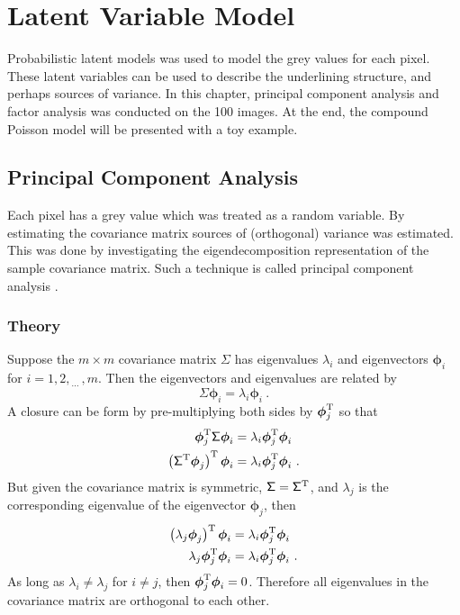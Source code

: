 \documentclass[12pt]{report}
\newcommand{\T}{^\textup{T}}
\newcommand{\dotdotdot}{_{\phantom{.}\cdots}}
\newcommand{\vectGreek}[1]{\boldsymbol{#1}}
\newcommand{\matr}[1]{\mathsf{#1}}
\begin{document}
\chapter{Latent Variable Model}
Probabilistic latent models was used to model the grey values for each pixel. These latent variables can be used to describe the underlining structure, and perhaps sources of variance. In this chapter, principal component analysis and factor analysis was conducted on the 100 images. At the end, the compound Poisson model will be presented with a toy example.

\section{Principal Component Analysis}
Each pixel has a grey value which was treated as a random variable. By estimating the covariance matrix sources of (orthogonal) variance was estimated. This was done by investigating the eigendecomposition representation of the sample covariance matrix. Such a technique is called principal component analysis \cite[pp.~329-330]{barber2012bayesian}.

\subsection{Theory}
Suppose the $m\times m$ covariance matrix $\matr{\Sigma}$ has eigenvalues $\lambda_i$ and eigenvectors $\vectGreek{\phi}_i$ for $i=1,2,\dotdotdot,m$. Then the eigenvectors and eigenvalues are related by
\begin{equation}
\matr{\Sigma}\vectGreek{\phi}_i = \lambda_i\vectGreek{\phi}_i \ .
\label{eq:eigenvector_eigenvalue_forCovariance}
\end{equation}
A closure can be form by pre-multiplying both sides by $\vectGreek{\phi}_j\T$ so that
\begin{align*}
\vectGreek{\phi}_j\T \matr{\Sigma}\vectGreek{\phi}_i &= \lambda_i\vectGreek{\phi}_j\T\vectGreek{\phi}_i \\
\left(\matr{\Sigma}\T \vectGreek{\phi}_j \right)\T\vectGreek{\phi}_i &= \lambda_i\vectGreek{\phi}_j\T\vectGreek{\phi}_i \ .
\end{align*}
But given the covariance matrix is symmetric, $\matr{\Sigma}=\matr{\Sigma}\T$, and $\lambda_j$ is the corresponding eigenvalue of the eigenvector $\vectGreek{\phi}_j$, then
\begin{align*}
\left(\lambda_j\vectGreek{\phi}_j \right)\T\vectGreek{\phi}_i &= \lambda_i\vectGreek{\phi}_j\T\vectGreek{\phi}_i \\
\lambda_j\vectGreek{\phi}_j\T\vectGreek{\phi}_i &= \lambda_i\vectGreek{\phi}_j\T\vectGreek{\phi}_i \ .
\end{align*}
As long as $\lambda_i\neq\lambda_j$ for $i\neq j$, then $\vectGreek{\phi}_j\T\vectGreek{\phi}_i=0$. Therefore all eigenvalues in the covariance matrix are orthogonal to each other.
\end{document}
